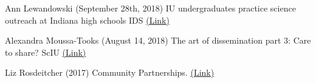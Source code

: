 \begin{cvpubentries}


\iftrue
  \cvpubentry
    { } %
    { } %
    { } %
    { } %
    {
      \begin{cvpubitems} %
	\item{Ann Lewandowski (September 28th, 2018) IU undergraduates practice science outreach at Indiana high schools IDS \href{https://www.idsnews.com/article/2018/09/iu-undergraduates-practice-science-outreach-at-indiana-high-schools}{(Link)}}
	\item{Alexandra Moussa-Tooks (August 14, 2018) The art of dissemination part 3: Care to share? ScIU \href{http://blogs.iu.edu/sciu/2018/08/14/dissemination-care-to-share/}{(Link)}}
	\item {Liz Rosdeitcher (2017) Community Partnerships. \href{Psyugrad https://pbsugrad.indiana.edu/psych4u/community-partnerships/index.html}{(Link)}}
      \end{cvpubitems}
    }
\fi


\end{cvpubentries}
